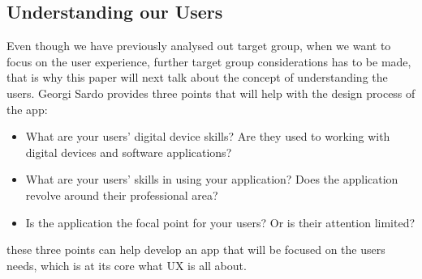 \subsection{Understanding our Users}
Even though we have previously analysed out target group, when we want to focus on the user experience, further target group considerations has to be made, that is why this paper will next talk about the concept of understanding the users. Georgi Sardo provides three points that will help with the design process of the app:
\begin{itemize}
\item What are your users’ digital device skills? Are they used to working with digital devices and software applications?\cite{Sardo}
\item What are your users’ skills in using your application? Does the application revolve around their professional area?\cite{Sardo}
\item Is the application the focal point for your users? Or is their attention limited?\cite{Sardo}
\end{itemize}
these three points can help develop an app that will be focused on the users needs, which is at its core what UX is all about.